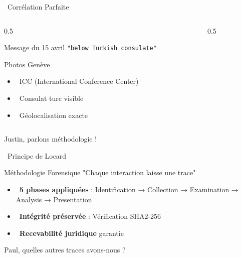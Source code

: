 \documentclass{beamer}
\begin{document}
\begin{frame}{\faBullseye \, Corrélation Parfaite}
\begin{columns}
\begin{column}{0.5\textwidth}
\begin{block}{Message du 15 avril}
\textcolor{crimsonred}{\texttt{"below Turkish consulate"}}
\end{block}

\begin{block}{Photos Genève}
\begin{itemize}
    \item \faCamera \, ICC (International Conference Center)
    \item \faFlag \, Consulat turc visible
    \item \faMapMarker \, Géolocalisation exacte
\end{itemize}
\end{block}
\end{column}

\begin{column}{0.5\textwidth}
\begin{center}
\fbox{\begin{minipage}{3.5cm}
\centering
\textcolor{gray}{Photos\\ICC \& Consulat\\Corrélation}
\end{minipage}}
\end{center}
\end{column}
\end{columns}

\pause
\begin{center}
\Large{\textcolor{hydroblue}{Justin, parlons méthodologie !}}
\end{center}
\end{frame}


\begin{frame}{\faBalanceScale \, Principe de Locard}
\begin{block}{Méthodologie Forensique}
\textcolor{forensicgreen}{\Large{"Chaque interaction laisse une trace"}}
\end{block}

\begin{itemize}
    \item \faCheckSquareO \, \textbf{5 phases appliquées} : Identification → Collection → Examination → Analysis → Presentation
    \item \faShield \, \textbf{Intégrité préservée} : Vérification SHA2-256
    \item \faGavel \, \textbf{Recevabilité juridique} garantie
\end{itemize}

\pause
\begin{center}
\Large{\textcolor{crimsonred}{Paul, quelles autres traces avons-nous ?}}
\end{center}
\end{frame}
\end{document}
